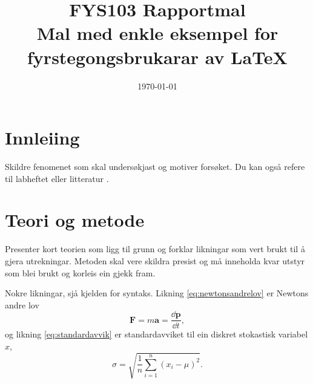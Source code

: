 \documentclass[11pt,twocolumn]{article}
\newcommand{\vect}[1]{\boldsymbol{#1}} %
\begin{document}
%
%
\title{FYS103 Rapportmal\\{\large Mal med enkle eksempel for fyrstegongsbrukarar av \LaTeX}}
\date{\today}

  
\section*{Innleiing}
Skildre fenomenet som skal undersøkjast og motiver forsøket. Du kan
også refere til labheftet \cite{labtext} eller litteratur
\cite{Jackson}.

\section*{Teori og metode}
Presenter kort teorien som ligg til grunn og forklar likningar som
vert brukt til å gjera utrekningar. Metoden skal vere skildra presist
og må inneholda kvar utstyr som blei brukt og korleis ein gjekk fram.

Nokre likningar, sjå kjelden for syntaks. Likning
\eqref{eq:newtonsandrelov} er Newtons andre lov
\begin{equation}
  \vect{F} = m\vect{a} = \frac{\dd{\vect{p}}}{\dd{t}}, %
  \label{eq:newtonsandrelov} %
\end{equation}
og likning \eqref{eq:standardavvik} er standardavviket til ein diskret
stokastisk variabel $x$,
\begin{equation}
  \label{eq:standardavvik}
  \sigma = \sqrt{\frac{1}{n}\sum_{i=1}^n(x_i-\mu)^2}.
\end{equation}
\end{document}
